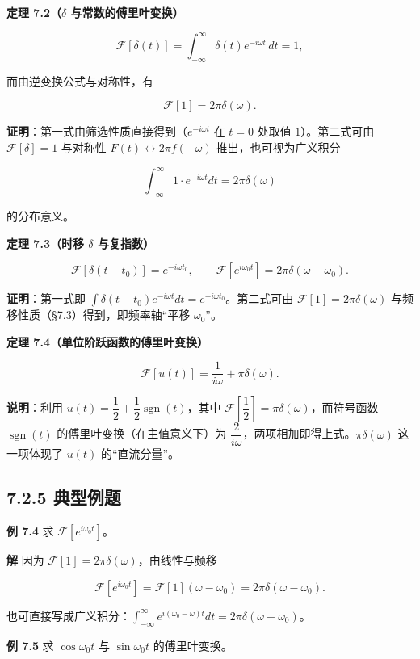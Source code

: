 \textbf{定理 7.2（\(\delta\) 与常数的傅里叶变换）}

\[
\mathcal F[\delta(t)]=\int_{-\infty}^{\infty}\delta(t)e^{-i\omega t}\,dt=1,
\]

而由逆变换公式与对称性，有

\[
\mathcal F[1]=2\pi\delta(\omega).
\]

\textbf{证明}：第一式由筛选性质直接得到（\(e^{-i\omega t}\) 在 \(t=0\)
处取值 \(1\)）。第二式可由 \(\mathcal F[\delta]=1\) 与对称性
\(F(t)\leftrightarrow 2\pi f(-\omega)\) 推出，也可视为广义积分

\[
\int_{-\infty}^{\infty}1\cdot e^{-i\omega t}dt=2\pi\delta(\omega)
\]

的分布意义。

\textbf{定理 7.3（时移 \(\delta\) 与复指数）}

\[
\mathcal F[\delta(t-t_0)]=e^{-i\omega t_0},
\qquad
\mathcal F\left[e^{i\omega_0 t}\right]=2\pi\delta(\omega-\omega_0).
\]

\textbf{证明}：第一式即
\(\int\delta(t-t_0)e^{-i\omega t}dt=e^{-i\omega t_0}\)。第二式可由
\(\mathcal F[1]=2\pi\delta(\omega)\)
与频移性质（§7.3）得到，即频率轴``平移 \(\omega_0\)''。

\textbf{定理 7.4（单位阶跃函数的傅里叶变换）}

\[
\mathcal F[u(t)]=\frac{1}{i\omega}+\pi\delta(\omega).
\]

\textbf{说明}：利用
\(u(t)=\dfrac{1}{2}+\dfrac{1}{2}\operatorname{sgn}(t)\)，其中
\(\mathcal F\left[\dfrac{1}{2}\right]=\pi\delta(\omega)\)，而符号函数
\(\operatorname{sgn}(t)\) 的傅里叶变换（在主值意义下）为
\(\dfrac{2}{i\omega}\)，两项相加即得上式。\(\pi\delta(\omega)\)
这一项体现了 \(u(t)\) 的``直流分量''。

\subsection{7.2.5 典型例题}\label{ux5178ux578bux4f8bux9898-3}

\textbf{例 7.4} 求 \(\mathcal F[e^{i\omega_0 t}]\)。

\textbf{解} 因为 \(\mathcal F[1]=2\pi\delta(\omega)\)，由线性与频移

\[
\mathcal F\left[e^{i\omega_0 t}\right]=\mathcal F[1](\omega-\omega_0)=2\pi\delta(\omega-\omega_0).
\]

也可直接写成广义积分：\(\int_{-\infty}^{\infty}e^{i(\omega_0-\omega)t}dt=2\pi\delta(\omega-\omega_0)\)。

\textbf{例 7.5} 求 \(\cos\omega_0 t\) 与 \(\sin\omega_0 t\)
的傅里叶变换。

